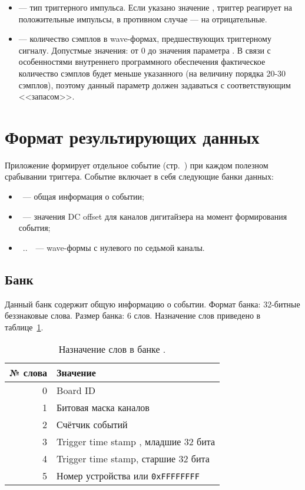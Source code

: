 \begin{itemize}
\item {} --- тип триггерного импульса. Если указано значение , триггер реагирует на положительные импульсы, в противном случае --- на отрицательные.

\item {} --- количество сэмплов в wave-формах, предшествующих триггерному сигналу. Допустмые значения: от 0 до значения параметра . В связи с особенностями внутреннего программного обеспечения \DEVICE{} \cite{CaenUM5961PostTrigger} фактическое количество сэмплов будет меньше указанного (на величину порядка 20-30 сэмплов), поэтому данный параметр должен задаваться с соответствующим <<запасом>>.

\end{itemize}

\section{Формат результирующих данных}

Приложение  формирует отдельное событие (стр.~\pageref{sec-midas-event}) при каждом полезном срабывании триггера. Событие включает в себя следующие банки данных:

\begin{itemize}

\item {}~--- общая информация о событии;
\item {}~--- значения DC offset для каналов дигитайзера на момент формирования события;
\item {}~..~~--- wave-формы с нулевого по седьмой каналы.

\end{itemize}

\subsection{Банк }
\label{sec_bank_info}

Данный банк содержит общую информацию о событии. Формат банка: 32-битные беззнаковые слова. Размер банка: 6 слов. Назначение слов приведено в таблице~\ref{tab-info-bank}.

\begin{table}[h]
\centering
\begin{tabular}{rl}
\hline\hline
№ слова & Значение \\
\hline

0 & Board ID \\
1 & Битовая маска каналов \\
2 & Счётчик событий \\
3 & Trigger time stamp \cite{CaenUM3051TS}, младшие 32 бита \\
4 & Trigger time stamp, старшие 32 бита \\
5 & Номер устройства или {\tt 0xFFFFFFFF} \\

\hline\hline
\end{tabular}
\caption{Назначение слов в банке .}
\label{tab-info-bank}
\end{table}

